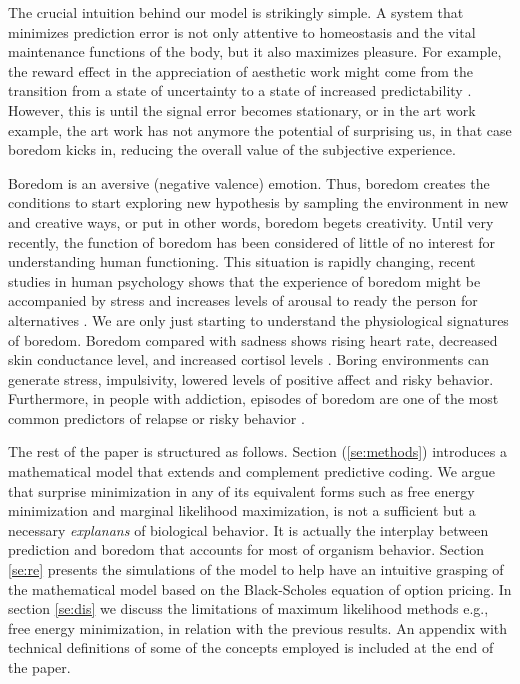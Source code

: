 \documentclass[11pt, onecolumn]{article}
\begin{document}
The crucial intuition behind our model is strikingly simple.
A system that minimizes prediction error is not only attentive to homeostasis and the vital maintenance functions of the body, but it also maximizes pleasure. For example, the reward effect in the appreciation of aesthetic work might come from the transition from a state of uncertainty to a state of increased predictability \citep{van_de_cruys_putting_2011}.
However, this is until the signal error becomes stationary, or in the art work example, the art work has not anymore the potential of surprising us, in that case boredom kicks in, reducing the overall value of the subjective experience.

Boredom is an aversive (negative valence) emotion. Thus, boredom creates the conditions to start exploring new hypothesis by sampling the environment in new and creative ways, or put in other words, boredom begets creativity. 
Until very recently, the function of boredom has been considered of little of no interest for understanding human functioning. This situation is rapidly changing, 
recent studies in human psychology shows that the experience of boredom might be accompanied by stress and increases levels of arousal to ready the person for alternatives \citep{posner_neurophysiological_2009} \citep{bench_function_2013}. We are only just starting to understand the physiological signatures of boredom. Boredom compared with sadness shows rising heart rate, decreased skin conductance level, and increased cortisol levels  \citep{merrifield_characterizing_2014}. Boring environments can generate stress, impulsivity, lowered levels of positive affect and risky behavior. Furthermore, in people with addiction, episodes of  boredom are one of the most common predictors of relapse or risky behavior \citep{blaszczynski_boredom_1990}.

The rest of the paper is structured as follows. Section (\ref{se:methods})  introduces a mathematical model that extends and complement predictive coding. We argue that surprise minimization in any of its equivalent forms such as free energy minimization and marginal likelihood maximization, is not a sufficient but a necessary \emph{explanans} of biological behavior. It is actually the interplay between prediction and boredom that accounts for most of organism behavior. Section \ref{se:re} presents the simulations of the model to help have an intuitive grasping of the mathematical model based on the Black-Scholes equation of option pricing.
In section \ref{se:dis} we discuss the limitations of maximum likelihood methods e.g., free energy minimization, in relation with the previous results. An appendix with technical definitions of some of the concepts employed is included at the end of the paper.
\end{document}
